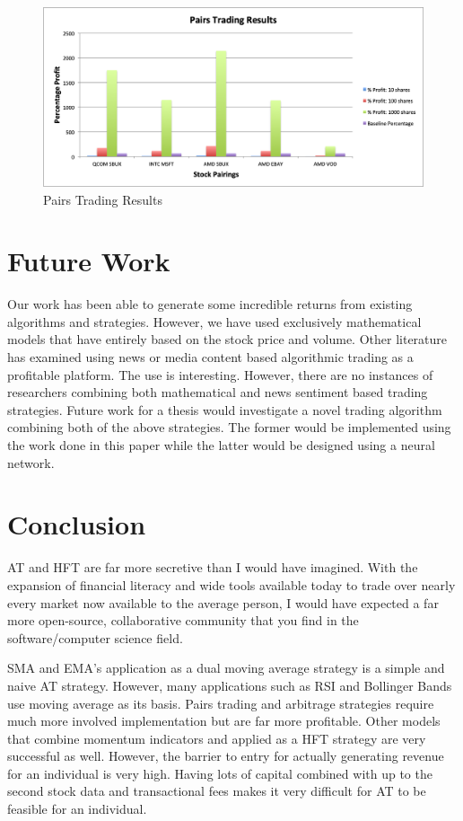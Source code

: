 \documentclass[letterpaper,11pt]{article}
\begin{document}
\begin{figure}[h]
\centering
\includegraphics[width=.9\textwidth]{pairstradingresults.png}
\caption{Pairs Trading Results \label{overflow}}
\label{PAIRSRESULTSfigure}
\end{figure}

\section{Future Work}
Our work has been able to generate some incredible returns from existing algorithms and strategies. However, we have used exclusively mathematical models that have entirely based on the stock price and volume. Other literature has examined using news or media content based algorithmic trading as a profitable platform. The use is interesting. However, there are no instances of researchers combining both mathematical and news sentiment based trading strategies. Future work for a thesis would investigate a novel trading algorithm combining both of the above strategies. The former would be implemented using the work done in this paper while the latter would be designed using a neural network.


\section{Conclusion}

AT and HFT are far more secretive than I would have imagined. With the expansion of financial literacy and wide tools available today to trade over nearly every market now available to the average person, I would have expected a far more open-source, collaborative community that you find in the software/computer science field. 

SMA and EMA's application as a dual moving average strategy is a simple and naive AT strategy. However, many applications such as RSI and Bollinger Bands use moving average as its basis. Pairs trading and arbitrage strategies require much more involved implementation but are far more profitable. Other models that combine momentum indicators and applied as a HFT strategy are very successful as well. However, the barrier to entry for actually generating revenue for an individual is very high. Having lots of capital combined with up to the second stock data and transactional fees makes it very difficult for AT to be feasible for an individual. 
\end{document}
